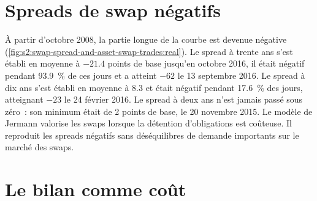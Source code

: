 \section{Spreads de swap négatifs}

À partir d'octobre 2008, la partie longue de la courbe est devenue négative (\cref{fig:s2:swap-spread-and-asset-swap-trades:real}). Le spread à trente ans s'est établi en moyenne à $-21.4$ points
de base jusqu'en octobre 2016, il était négatif pendant 93.9~\% de ces jours et a atteint $-62$ le 13 septembre 2016. Le spread à dix ans s'est établi en moyenne à 8.3 et était négatif
pendant 17.6~\% des jours, atteignant $-23$ le 24 février 2016. Le spread à deux ans n'est jamais passé sous zéro~: son minimum était de 2 points de base, le 20 novembre 2015.
Le modèle de Jermann valorise les swaps lorsque la détention d'obligations est coûteuse. Il reproduit les spreads négatifs sans déséquilibres de demande importants sur le marché des swaps.

\begin{omfigure}

\label{fig:s2:swap-spread-and-asset-swap-trades:real}
\end{omfigure}

\section{Le bilan comme coût}

